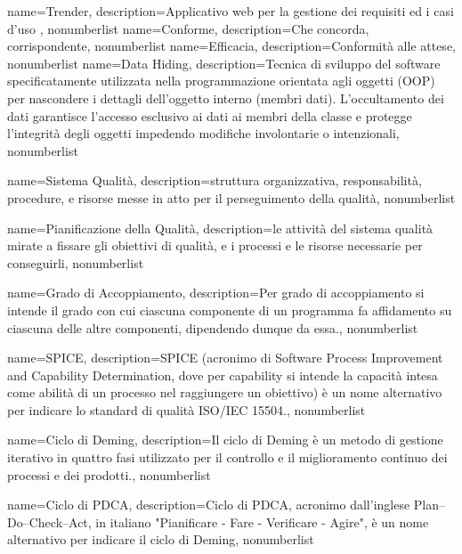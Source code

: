 {
	name={Trender},
	description={Applicativo web per la gestione dei requisiti ed i casi d'uso },
	nonumberlist
}
{
	name={Conforme},
	description={Che concorda, corrispondente},
	nonumberlist
}
{
	name={Efficacia},
	description={Conformità alle attese},
	nonumberlist
}
{
	name={Data Hiding},
	description={Tecnica di sviluppo del software specificatamente utilizzata nella programmazione orientata agli oggetti (OOP) per nascondere i dettagli dell'oggetto interno (membri dati). L'occultamento dei dati garantisce l'accesso esclusivo ai dati ai membri della classe e protegge l'integrità degli oggetti impedendo modifiche involontarie o intenzionali},
	nonumberlist
}

{
	name={Sistema Qualità},
	description={struttura organizzativa, responsabilità, procedure, e risorse messe in atto per il perseguimento della qualità},
	nonumberlist 
}

{
	name={Pianificazione della Qualità},
	description={le attività del sistema qualità mirate a fissare gli obiettivi di qualità, e i processi e le risorse necessarie per conseguirli},
	nonumberlist 
}

{
	name={Grado di Accoppiamento},
	description={Per grado di accoppiamento si intende il grado con cui ciascuna componente di un programma fa affidamento su ciascuna delle altre componenti, dipendendo dunque da essa.},
	nonumberlist 
}

{
	name={SPICE},
	description={SPICE (acronimo di Software Process Improvement and Capability Determination, dove per capability si intende la capacità intesa come abilità di un processo nel raggiungere un obiettivo) è un nome alternativo per indicare lo standard di qualità ISO/IEC 15504.}, 
	nonumberlist 
}

{
	name={Ciclo di Deming},
	description={Il ciclo di Deming è un metodo di gestione iterativo in quattro fasi utilizzato per il controllo e il miglioramento continuo dei processi e dei prodotti.}, 
	nonumberlist 
}

{
	name={Ciclo di PDCA},
	description={Ciclo di PDCA, acronimo dall'inglese Plan–Do–Check–Act, in italiano "Pianificare - Fare - Verificare - Agire", è un nome alternativo per indicare il ciclo di Deming}, 
	nonumberlist 
}

